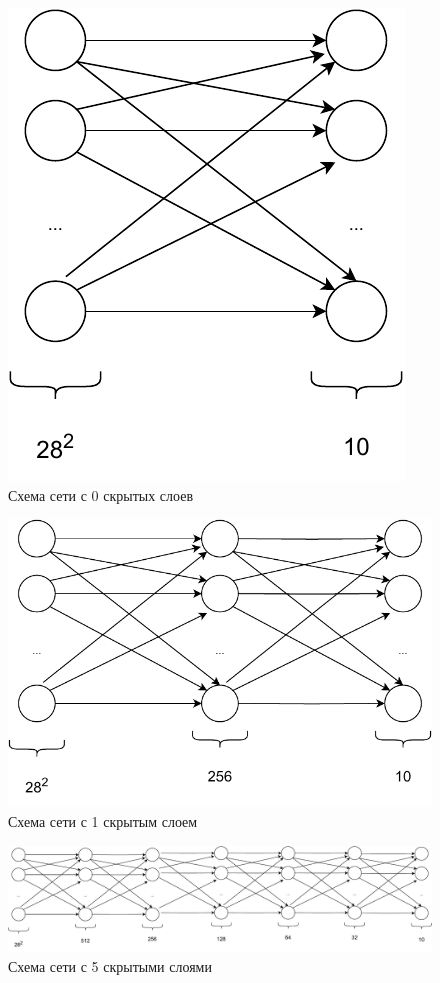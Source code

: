 \documentclass[12pt]{report}
\begin{document}
\newpage
\begin{figure}[h!]
  \centering
  \includegraphics[scale = 0.7]{layer_0.pdf}
  \caption{Схема сети с 0 скрытых слоев}
  \label{fig:layer0_sc}
\end{figure}

\begin{figure}[h!]
  \centering
  \includegraphics[scale = 0.8]{layer_1.pdf}
  \caption{Схема сети с 1 скрытым слоем}
  \label{fig:layer1_sc}
\end{figure}

\begin{figure}[h!]
  \centering
  \includegraphics[width = \linewidth]{layer_5.pdf}
  \caption{Схема сети с 5 скрытыми слоями}
  \label{fig:layer5_sc}
\end{figure}
\end{document}
